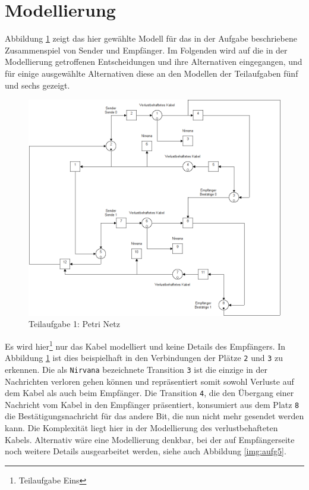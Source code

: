 \documentclass[10pt]{scrartcl}
\author{André Harms, Oliver Steenbuck}
\title{\titletext}
\date{04.04.2012}
\begin{document}
\maketitle

\setcounter{tocdepth}{3}
\tableofcontents

	\listoffigures  
	\lstlistoflistings	

\section{Modellierung}
	Abbildung \ref{img:aufg1} zeigt das hier gewählte Modell für das in der Aufgabe beschriebene Zusammenspiel von Sender und Empfänger. Im Folgenden wird auf die in der Modellierung getroffenen Entscheidungen und ihre Alternativen eingegangen, und für einige ausgewählte Alternativen diese an den Modellen der Teilaufgaben fünf und sechs gezeigt.
	  
	\begin{figure}[H]
                \includegraphics[scale=0.5]{praktikum1-aufgabe1.png}
        \caption{Teilaufgabe 1: Petri Netz}
        \label{img:aufg1}
	\end{figure}
	
	
Es wird hier\footnote{Teilaufgabe Eins} nur das Kabel modelliert und keine Details des Empfängers. In Abbildung \ref{img:aufg1} ist dies beispielhaft in den Verbindungen der Plätze \verb!2! und \verb!3! zu erkennen. Die als \verb!Nirvana! bezeichnete Transition \verb!3! ist die einzige in der Nachrichten verloren gehen können und repräsentiert somit sowohl Verluste auf dem Kabel als auch beim Empfänger. Die Transition \verb!4!, die den Übergang einer Nachricht vom Kabel in den Empfänger präsentiert, konsumiert aus dem Platz \verb!8! die Bestätigungsnachricht für das andere Bit, die nun nicht mehr gesendet werden kann.
Die Komplexität liegt hier in der Modellierung des verlustbehafteten Kabels. Alternativ wäre eine Modellierung denkbar, bei der auf Empfängerseite noch weitere Details ausgearbeitet werden, siehe auch Abbildung \ref{img:aufg5}.
\end{document}
